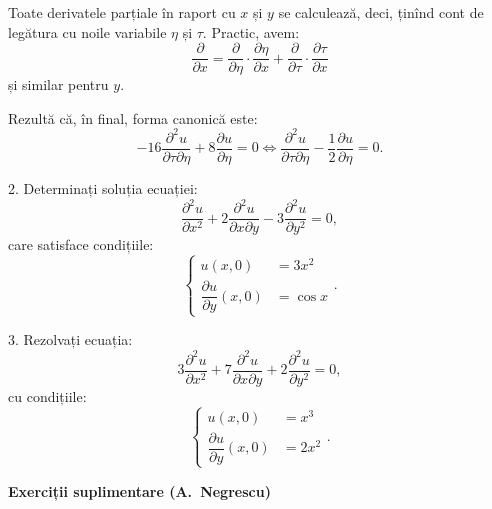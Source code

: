Toate derivatele parțiale în raport cu $ x $ și $ y $ se calculează, deci, ținînd cont de legătura
cu noile variabile $ \eta $ și $ \tau $. Practic, avem:
\[
  \dfrac{\partial}{\partial x} = \dfrac{\partial}{\partial \eta} \cdot \dfrac{\partial \eta}{\partial x} + %
  \dfrac{\partial}{\partial \tau} \cdot \dfrac{\partial \tau}{\partial x}
\]
și similar pentru $ y $.

Rezultă că, în final, forma canonică este:
\[
  -16 \dfrac{\partial^2 u}{\partial \tau \partial \eta} + 8 \dfrac{\partial u}{\partial \eta} = 0 %
  \Leftrightarrow \dfrac{\partial^2 u}{\partial \tau \partial \eta} - %
  \dfrac{1}{2} \dfrac{\partial u}{\partial \eta} = 0.
\]

\vspace{1cm}

2. Determinați soluția ecuației:
\[
  \dfrac{\partial^2 u}{\partial x^2} + 2 \dfrac{\partial^2 u}{\partial x \partial y} - %
  3 \dfrac{\partial^2 u}{\partial y^2} = 0,
\]
care satisface condițiile:
\[
  \begin{cases}
    u(x, 0) &= 3x^2 \\
    \dfrac{\partial u}{\partial y}(x, 0) &= \cos x
  \end{cases}.
\]

\vspace{1cm}

3. Rezolvați ecuația:
\[
  3 \dfrac{\partial^2 u}{\partial x^2} + 7 \dfrac{\partial^2 u}{\partial x\partial y} + %
  2 \dfrac{\partial^2 u}{\partial y^2} = 0,
\]
cu condițiile:
\[
  \begin{cases}
    u(x, 0) &= x^3 \\
    \dfrac{\partial u}{\partial y}(x, 0) &= 2x^2
  \end{cases}.
\]

\vspace{1cm}

\textbf{Exerciții suplimentare (A.\ Negrescu)}

